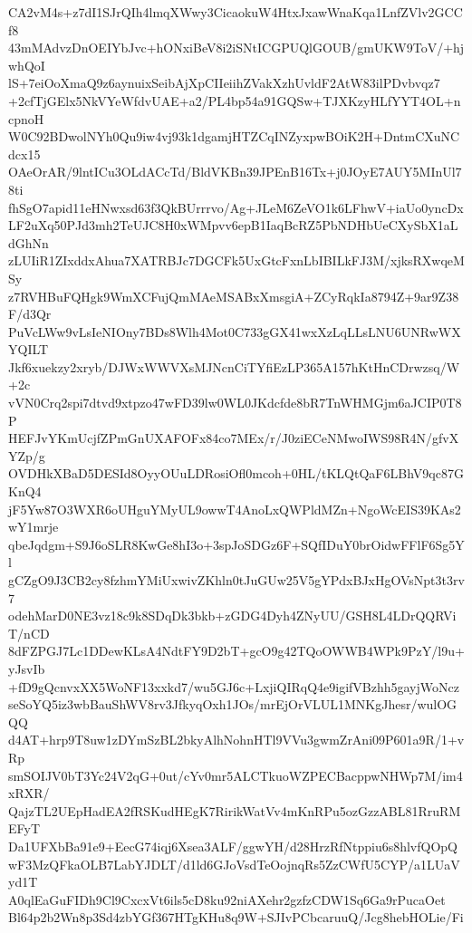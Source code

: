 CA2vM4s+z7dI1SJrQIh4lmqXWwy3CicaokuW4HtxJxawWnaKqa1LnfZVlv2GCCf8
43mMAdvzDnOEIYbJvc+hONxiBeV8i2iSNtICGPUQlGOUB/gmUKW9ToV/+hjwhQoI
lS+7eiOoXmaQ9z6aynuixSeibAjXpCIIeiihZVakXzhUvldF2AtW83ilPDvbvqz7
+2cfTjGElx5NkVYeWfdvUAE+a2/PL4bp54a91GQSw+TJXKzyHLfYYT4OL+ncpnoH
W0C92BDwolNYh0Qu9iw4vj93k1dgamjHTZCqINZyxpwBOiK2H+DntmCXuNCdcx15
OAeOrAR/9lntICu3OLdACcTd/BldVKBn39JPEnB16Tx+j0JOyE7AUY5MInUl78ti
fhSgO7apid11eHNwxsd63f3QkBUrrrvo/Ag+JLeM6ZeVO1k6LFhwV+iaUo0yncDx
LF2uXq50PJd3mh2TeUJC8H0xWMpvv6epB1IaqBcRZ5PbNDHbUeCXySbX1aLdGhNn
zLUIiR1ZIxddxAhua7XATRBJc7DGCFk5UxGtcFxnLbIBILkFJ3M/xjksRXwqeMSy
z7RVHBuFQHgk9WmXCFujQmMAeMSABxXmsgiA+ZCyRqkIa8794Z+9ar9Z38F/d3Qr
PuVcLWw9vLsIeNIOny7BDs8Wlh4Mot0C733gGX41wxXzLqLLsLNU6UNRwWXYQILT
Jkf6xuekzy2xryb/DJWxWWVXsMJNcnCiTYfiEzLP365A157hKtHnCDrwzsq/W+2c
vVN0Crq2spi7dtvd9xtpzo47wFD39lw0WL0JKdcfde8bR7TnWHMGjm6aJCIP0T8P
HEFJvYKmUcjfZPmGnUXAFOFx84co7MEx/r/J0ziECeNMwoIWS98R4N/gfvXYZp/g
OVDHkXBaD5DESId8OyyOUuLDRosiOfl0mcoh+0HL/tKLQtQaF6LBhV9qc87GKnQ4
jF5Yw87O3WXR6oUHguYMyUL9owwT4AnoLxQWPldMZn+NgoWcEIS39KAs2wY1mrje
qbeJqdgm+S9J6oSLR8KwGe8hI3o+3spJoSDGz6F+SQfIDuY0brOidwFFlF6Sg5Yl
gCZgO9J3CB2cy8fzhmYMiUxwivZKhln0tJuGUw25V5gYPdxBJxHgOVsNpt3t3rv7
odehMarD0NE3vz18c9k8SDqDk3bkb+zGDG4Dyh4ZNyUU/GSH8L4LDrQQRViT/nCD
8dFZPGJ7Lc1DDewKLsA4NdtFY9D2bT+gcO9g42TQoOWWB4WPk9PzY/l9u+yJsvIb
+fD9gQcnvxXX5WoNF13xxkd7/wu5GJ6c+LxjiQIRqQ4e9igifVBzhh5gayjWoNcz
seSoYQ5iz3wbBauShWV8rv3JfkyqOxh1JOs/mrEjOrVLUL1MNKgJhesr/wulOGQQ
d4AT+hrp9T8uw1zDYmSzBL2bkyAlhNohnHTl9VVu3gwmZrAni09P601a9R/1+vRp
smSOIJV0bT3Yc24V2qG+0ut/cYv0mr5ALCTkuoWZPECBacppwNHWp7M/im4xRXR/
QajzTL2UEpHadEA2fRSKudHEgK7RirikWatVv4mKnRPu5ozGzzABL81RruRMEFyT
Da1UFXbBa91e9+EecG74iqj6Xsea3ALF/ggwYH/d28HrzRfNtppiu6s8hlvfQOpQ
wF3MzQFkaOLB7LabYJDLT/d1ld6GJoVsdTeOojnqRs5ZzCWfU5CYP/a1LUaVyd1T
A0qlEaGuFIDh9Cl9CxcxVt6ils5cD8ku92niAXehr2gzfzCDW1Sq6Ga9rPucaOet
Bl64p2b2Wn8p3Sd4zbYGf367HTgKHu8q9W+SJIvPCbcaruuQ/Jcg8hebHOLie/Fi
